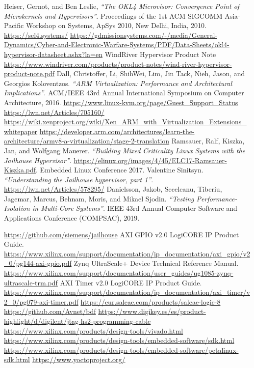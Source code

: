 \documentclass[spanish,12pt,a4paper,oneside]{book}
\begin{document}
\begin{thebibliography}{00}
   Heiser, Gernot, and Ben Leslie, \emph{``The OKL4 Microvisor: Convergence Point of Microkernels and Hypervisors''}. Proceedings of the 1st ACM SIGCOMM Asia-Pacific Workshop on Systems, ApSys 2010, New Delhi, India, 2010.
   \url{https://sel4.systems/}
   \url{https://gdmissionsystems.com/-/media/General-Dynamics/Cyber-and-Electronic-Warfare-Systems/PDF/Data-Sheets/okl4-hypervisor-datasheet.ashx?la=en}
   WindRiver Hypervisor Product Note \url{https://www.windriver.com/products/product-notes/wind-river-hypervisor-product-note.pdf}
   Dall, Christoffer, Li, Shih\-Wei, Lim, Jin Tack, Nieh, Jason, and Georgios Koloventzos. \emph{``ARM Virtualization: Performance and Architectural Implications''}. ACM/IEEE 43rd Annual International Symposium on Computer Architecture, 2016.
   \url{https://www.linux-kvm.org/page/Guest_Support_Status}
	 \url{https://lwn.net/Articles/705160/}
   \url{https://wiki.xenproject.org/wiki/Xen_ARM_with_Virtualization_Extensions_whitepaper}
   \url{https://developer.arm.com/architectures/learn-the-architecture/armv8-a-virtualization/stage-2-translation}
   Ramsauer, Ralf, Kiszka, Jan, and Wolfgang Mauerer. \emph{``Building Mixed Criticality Linux Systems with the Jailhouse Hypervisor''}. \url{https://elinux.org/images/4/45/ELC17-Ramsauer-Kiszka.pdf}. Embedded Linux Conference 2017.
   Valentine Sinitsyn. \emph{``Understanding the Jailhouse hypervisor, part 1''}. \url{https://lwn.net/Articles/578295/}
   Danielsson, Jakob, Seceleanu, Tiberiu, Jagemar, Marcus, Behnam, Moris, and Mikael Sjodin. \emph{``Testing Performance-Isolation in Multi-Core Systems''}. IEEE 43rd Annual Computer Software and Applications Conference (COMPSAC), 2019.

   \url{https://github.com/siemens/jailhouse}
   AXI GPIO v2.0 LogiCORE IP Product Guide. \url{https://www.xilinx.com/support/documentation/ip_documentation/axi_gpio/v2_0/pg144-axi-gpio.pdf}
   Zynq UltraScale+ Device Technical Reference Manual. \url{https://www.xilinx.com/support/documentation/user_guides/ug1085-zynq-ultrascale-trm.pdf}
   AXI Timer v2.0 LogiCORE IP Product Guide. \url{https://www.xilinx.com/support/documentation/ip_documentation/axi_timer/v2_0/pg079-axi-timer.pdf}
   \url{https://eur.saleae.com/products/saleae-logic-8}
   \url{https://github.com/Avnet/bdf}
   \url{https://www.digikey.es/es/product-highlight/d/digilent/jtag-hs2-programming-cable}
   \url{https://www.xilinx.com/products/design-tools/vivado.html}
  \url{https://www.xilinx.com/products/design-tools/embedded-software/sdk.html}
  \url{https://www.xilinx.com/products/design-tools/embedded-software/petalinux-sdk.html}
  \url{https://www.yoctoproject.org/}


\end{thebibliography}
\end{document}
